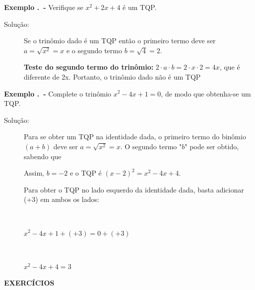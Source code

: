 \noindent\textbf{Exemplo \thesubsection.\theexemplo~-} Verifique se $x^2 + 2x + 4$ é um TQP.

\begin{description}
\item [Solução:] Se o trinômio dado é um TQP então o primeiro termo deve ser $a = \sqrt{x^2} = x$ e o segundo termo $b = \sqrt{4} = 2$.

\textbf{Teste do segundo termo do trinômio:}  $2 \cdot a \cdot b = 2 \cdot x \cdot 2 = 4x$, que é diferente de 2x. Portanto, o trinômio dado não é um TQP \qedsymbol{}

\end{description}

\noindent\textbf{Exemplo \thesubsection.\theexemplo~-} Complete o trinômio $x^2 - 4x + 1 = 0$, de modo que obtenha-se um TQP.

\begin{description}
\item [Solução:] Para se obter um TQP na identidade dada, o primeiro termo do binômio $(a+b)$ deve ser $a=\sqrt{x^2}=x$. O segundo termo "$b$" pode ser obtido, sabendo que


Assim, $b = -2$ e o TQP é $(x-2)^2 = x^2 - 4x + 4$.

Para obter o TQP no lado esquerdo da identidade dada, basta adicionar (+3) em ambos os lados:

~~

$x^2 - 4x +1 +(+3) = 0 +(+3)$

~

$x^2 -4x + 4  = 3$ \qedsymbol{}

\end{description}

\textbf{EXERCÍCIOS \thesubsection}

